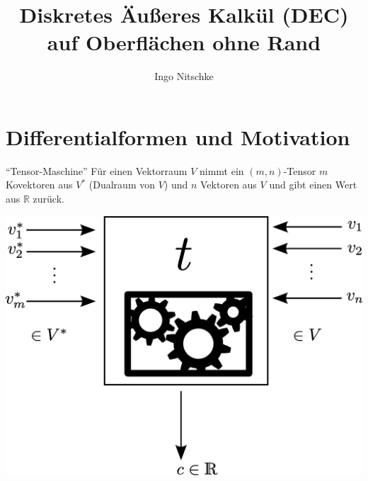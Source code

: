 \documentclass{beamer}
\title[DEC]{Diskretes Äußeres Kalkül (DEC)\\auf Oberflächen ohne Rand}
\author{Ingo Nitschke}
\institute{IWR - TU Dresden}
\newcommand{\R}{\mathds{R}}
\begin{document}
 \frame{ \titlepage }

  
\section{Differentialformen und Motivation}

  \begin{frame}
    \begin{block}{"`Tensor-Maschine"'}
      Für einen Vektorraum \( V \) nimmt ein \( (m,n) \)-Tensor \( m \) Kovektoren aus \( V^{*} \)
      (Dualraum von \( V \)) und \( n \) Vektoren aus \( V \) und gibt einen Wert aus \( \R \) zurück.

      \centering\includegraphics[height=0.7\textheight]{bilder/tensormaschine/Tensor.eps}
    \end{block}
  \end{frame}
\end{document}
